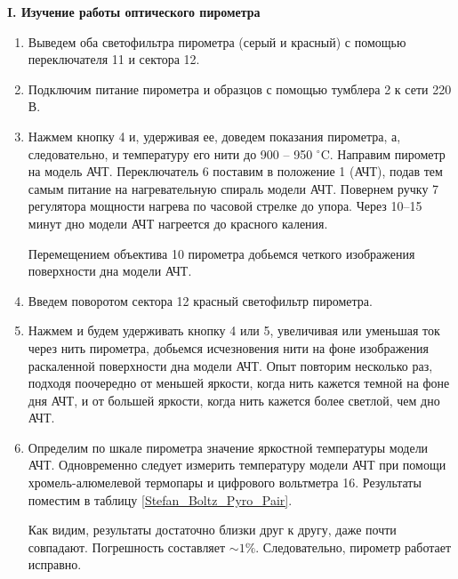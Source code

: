	
	\newpage
	\begin{center}
		\textbf{I. Изучение работы оптического пирометра}
	\end{center}
	\begin{enumerate}
		\item Выведем оба светофильтра пирометра (серый и красный) с помощью переключателя 11 и сектора 12.
		
		\item Подключим питание пирометра и образцов с помощью тумблера 2 к сети 220 В.
		
		\item Нажмем кнопку 4 и, удерживая ее, доведем показания пирометра, а, следовательно, и температуру его нити до 900 -- 950 $^\circ$C. Направим пирометр на модель АЧТ. Переключатель 6 поставим в положение 1 (АЧТ), подав тем самым питание на нагревательную спираль модели АЧТ. Повернем ручку 7 регулятора мощности нагрева по часовой стрелке до упора. Через 10–15 минут дно модели АЧТ нагреется до красного каления.

		
		Перемещением объектива 10 пирометра добьемся четкого изображения поверхности дна модели АЧТ.
		
		\item Введем поворотом сектора 12 красный светофильтр пирометра.
		
		\item Нажмем и будем удерживать кнопку 4 или 5, увеличивая или уменьшая ток через нить пирометра, добьемся исчезновения нити на фоне изображения раскаленной поверхности дна модели АЧТ. Опыт повторим несколько раз, подходя поочередно от меньшей яркости, когда нить кажется темной на фоне дня АЧТ, и от большей яркости, когда нить кажется более светлой, чем дно АЧТ.

		
		\item Определим по шкале пирометра значение яркостной температуры модели АЧТ. Одновременно следует измерить температуру модели АЧТ при помощи хромель-алюмелевой термопары и цифрового вольтметра 16. Результаты поместим в таблицу \ref{Stefan_Boltz_Pyro_Pair}.
		
	
		\begin{table}[h!]
			\centering
			\caption{Яркостная температура АЧТ}
			\label{Stefan_Boltz_Pyro_Pair}
		\end{table}
	
		Как видим, результаты достаточно близки друг к другу, даже почти совпадают. Погрешность составляет $\sim 1\%$. Следовательно, пирометр работает исправно.
	\end{enumerate}

